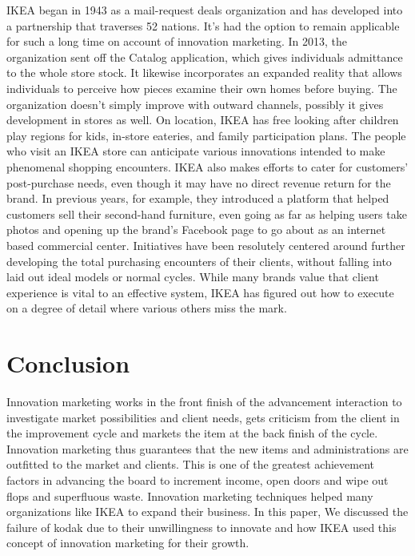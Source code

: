 \documentclass{article}
\begin{document}
IKEA began in 1943 as a mail-request deals organization and has developed into a
partnership that traverses 52 nations. It's had the option to remain applicable for such a
long time on account of innovation marketing. In 2013, the organization sent off the
Catalog application, which gives individuals admittance to the whole store stock. It
likewise incorporates an expanded reality that allows individuals to perceive how pieces
examine their own homes before buying. The organization doesn't simply improve with
outward channels, possibly it gives development in stores as well. On location, IKEA has
free looking after children play regions for kids, in-store eateries, and family
participation plans.
The people who visit an IKEA store can anticipate various innovations intended to make
phenomenal shopping encounters.
IKEA also makes efforts to cater for customers’ post-purchase needs, even though it
may have no direct revenue return for the brand. In previous years, for example, they
introduced a platform that helped customers sell their second-hand furniture, even
going as far as helping users take photos and opening up the brand's Facebook page to
go about as an internet based commercial center. Initiatives have been resolutely centered around further developing the total purchasing
encounters of their clients, without falling into laid out ideal models or normal cycles.
While many brands value that client experience is vital to an effective system, IKEA has
figured out how to execute on a degree of detail where various others miss the mark.

\section{ Conclusion}

Innovation marketing works in the front finish of the advancement interaction to
investigate market possibilities and client needs, gets criticism from the client in the
improvement cycle and markets the item at the back finish of the cycle. Innovation
marketing thus guarantees that the new items and administrations are outfitted to the
market and clients. This is one of the greatest achievement factors in advancing the
board to increment income, open doors and wipe out flops and superfluous waste.
Innovation marketing techniques helped many organizations like IKEA to expand their
business. In this paper, We discussed the failure of kodak due to their unwillingness to
innovate and how IKEA used this concept of innovation marketing for their growth.
\end{document}
